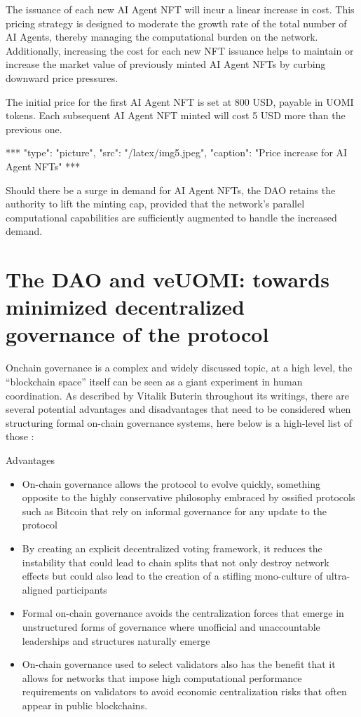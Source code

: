 \documentclass{article}
\begin{document}
The issuance of each new AI Agent NFT will incur a linear increase in cost. This pricing strategy is designed to moderate the growth rate of the total number of AI Agents, thereby managing the computational burden on the network. Additionally, increasing the cost for each new NFT issuance helps to maintain or increase the market value of previously minted AI Agent NFTs by curbing downward price pressures.

The initial price for the first AI Agent NFT is set at 800 USD, payable in UOMI tokens. Each subsequent AI Agent NFT minted will cost 5 USD more than the previous one.



***
"type": "picture",
"src": "/latex/img5.jpeg",
"caption": "Price increase for AI Agent NFTs"
***


Should there be a surge in demand for AI Agent NFTs, the DAO retains the authority to lift the minting cap, provided that the network's parallel computational capabilities are sufficiently augmented to handle the increased demand.



\section{The DAO and veUOMI:  towards minimized decentralized governance of the protocol
}

Onchain governance is a complex and widely discussed topic, at a high level, the “blockchain space” itself can be seen as a giant experiment in human coordination. As described by Vitalik Buterin throughout its writings, there are several potential advantages and disadvantages that need to be considered when structuring formal on-chain governance systems, here below is a high-level list of those :


Advantages 

\begin{itemize}

\item On-chain governance allows the protocol to evolve quickly, something opposite to the highly conservative philosophy embraced by ossified protocols such as Bitcoin that rely on informal governance for any update to the protocol

\item By creating an explicit decentralized voting framework, it reduces the instability that could lead to chain splits that not only destroy network effects but could  also lead to the creation of a stifling mono-culture of ultra-aligned participants 

\item Formal on-chain governance avoids the centralization forces that emerge in  unstructured forms of governance where unofficial and unaccountable leaderships and structures naturally emerge 

\item On-chain governance used to select validators also has the benefit that it allows for networks that impose high computational performance requirements on validators to avoid economic centralization risks that often appear in public blockchains.

\end{itemize}
\end{document}
